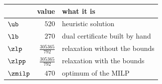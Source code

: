 \begin{center}\small
\begin{tabular}{lrl}
\toprule
 & value & what it is \\
\midrule
$\ub$ & $520$ & heuristic solution \\
$\lb$ & $270$ & dual certificate built by hand \\
$\zlp$ & $\frac{305365}{792}$ & relaxation without the bounds \\
$\zlpp$ & $\frac{305365}{792}$ & relaxation with the bounds \\
$\zmilp$ & $470$ & optimum of the MILP \\
\bottomrule
\end{tabular}
\end{center}
